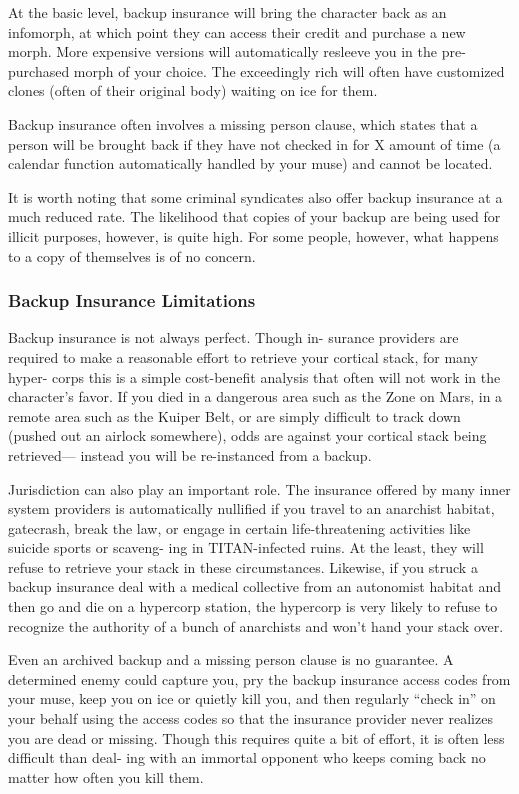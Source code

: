 At the basic level, backup insurance will bring the 
character back as an infomorph, at which point they 
can access their credit and purchase a new morph. 
More expensive versions will automatically resleeve 
you in the pre-purchased morph of your choice. The 
exceedingly rich will often have customized clones 
(often of their original body) waiting on ice for them.

Backup insurance often involves a missing person 
clause, which states that a person will be brought 
back if they have not checked in for X amount of time 
(a calendar function automatically handled by your 
muse) and cannot be located.

It is worth noting that some criminal syndicates 
also offer backup insurance at a much reduced rate. 
The likelihood that copies of your backup are being 
used for illicit purposes, however, is quite high. For 
some people, however, what happens to a copy of 
themselves is of no concern.

\subsubsection{Backup Insurance Limitations}

Backup insurance is not always perfect. Though in-
surance providers are required to make a reasonable 
effort to retrieve your cortical stack, for many hyper-
corps this is a simple cost-benefit analysis that often 
will not work in the character's favor. If you died in a 
dangerous area such as the Zone on Mars, in a remote 
area such as the Kuiper Belt, or are simply difficult 
to track down (pushed out an airlock somewhere), 
odds are against your cortical stack being retrieved—
instead you will be re-instanced from a backup.

Jurisdiction can also play an important role. The 
insurance offered by many inner system providers is 
automatically nullified if you travel to an anarchist 
habitat, gatecrash, break the law, or engage in certain 
life-threatening activities like suicide sports or scaveng-
ing in TITAN-infected ruins. At the least, they will 
refuse to retrieve your stack in these circumstances. 
Likewise, if you struck a backup insurance deal with 
a medical collective from an autonomist habitat and 
then go and die on a hypercorp station, the hypercorp 
is very likely to refuse to recognize the authority of a 
bunch of anarchists and won't hand your stack over.

Even an archived backup and a missing person 
clause is no guarantee. A determined enemy could 
capture you, pry the backup insurance access codes 
from your muse, keep you on ice or quietly kill you, 
and then regularly ``check in'' on your behalf using 
the access codes so that the insurance provider never 
realizes you are dead or missing. Though this requires 
quite a bit of effort, it is often less difficult than deal-
ing with an immortal opponent who keeps coming 
back no matter how often you kill them.

